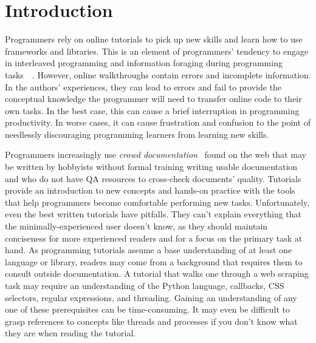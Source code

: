 \section{Introduction}

Programmers rely on online tutorials to pick up new skills and learn how to use frameworks and libraries.
This is an element of programmers' tendency to engage in interleaved programming and information foraging during programming tasks~\cite{brandt_two_2009}~\cite{brandt_example-centric_2010}.
However, online walkthroughs contain errors and incomplete information.
In the authors' experiences, they can lead to errors and fail to provide the conceptual knowledge the programmer will need to transfer online code to their own tasks.
In the best case, this can cause a brief interruption in programming productivity.
In worse cases, it can cause frustration and confusion to the point of needlessly discouraging programming learners from learning new skills.

Programmers increasingly use \emph{crowd documentation}~\cite{parnin_measuring_2011} found on the web that may be written by hobbyists without formal training writing usable documentation and who do not have QA resources to cross-check documents' quality.
Tutorials provide an introduction to new concepts and hands-on practice with the tools that help programmers become comfortable performing new tasks.
Unfortunately, even the best written tutorials have pitfalls.
They can't explain everything that the minimally-experienced user doesn't know, as they should maintain conciseness for more experienced readers and for a focus on the primary task at hand.
As programming tutorials assume a base understanding of at least one language or library, readers may come from a background that requires them to consult outside documentation.
A tutorial that walks one through a web scraping task may require an understanding of the Python language, callbacks, CSS selectors, regular expressions, and threading.
Gaining an understanding of any one of these prerequisites can be time-consuming.
It may even be difficult to grasp references to concepts like threads and processes if you don't know what they are when reading the tutorial.


